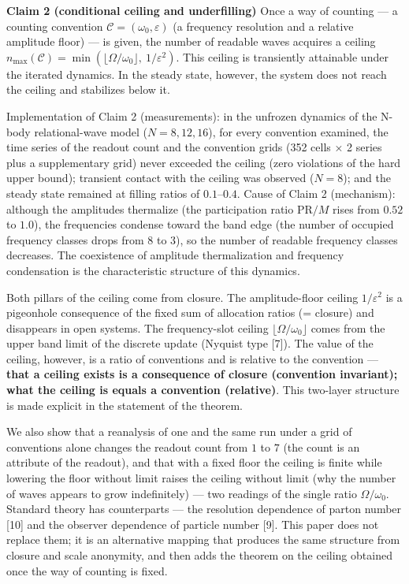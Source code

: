 \documentclass[
  a4paper,
]{article}
\begin{document}
\textbf{Claim 2 (conditional ceiling and underfilling)} Once a way of
counting --- a counting convention \(\mathcal C=(\omega_0,\varepsilon)\)
(a frequency resolution and a relative amplitude floor) --- is given,
the number of readable waves acquires a ceiling
\(n_{\max}(\mathcal C)=\min(\lfloor\Omega/\omega_0\rfloor,\ 1/\varepsilon^2)\).
This ceiling is transiently attainable under the iterated dynamics. In
the steady state, however, the system does not reach the ceiling and
stabilizes below it.

Implementation of Claim 2 (measurements): in the unfrozen dynamics of
the N-body relational-wave model (\(N=8,12,16\)), for every convention
examined, the time series of the readout count and the convention grids
(352 cells × 2 series plus a supplementary grid) never exceeded the
ceiling (zero violations of the hard upper bound); transient contact
with the ceiling was observed (\(N=8\)); and the steady state remained
at filling ratios of \(0.1\)--\(0.4\). Cause of Claim 2 (mechanism):
although the amplitudes thermalize (the participation ratio
\(\mathrm{PR}/M\) rises from \(0.52\) to \(1.0\)), the frequencies
condense toward the band edge (the number of occupied frequency classes
drops from \(8\) to \(3\)), so the number of readable frequency classes
decreases. The coexistence of amplitude thermalization and frequency
condensation is the characteristic structure of this dynamics.

Both pillars of the ceiling come from closure. The amplitude-floor
ceiling \(1/\varepsilon^2\) is a pigeonhole consequence of the fixed sum
of allocation ratios (= closure) and disappears in open systems. The
frequency-slot ceiling \(\lfloor\Omega/\omega_0\rfloor\) comes from the
upper band limit of the discrete update (Nyquist type {[}7{]}). The
value of the ceiling, however, is a ratio of conventions and is relative
to the convention --- \textbf{that a ceiling exists is a consequence of
closure (convention invariant); what the ceiling is equals a convention
(relative)}. This two-layer structure is made explicit in the statement
of the theorem.

We also show that a reanalysis of one and the same run under a grid of
conventions alone changes the readout count from \(1\) to \(7\) (the
count is an attribute of the readout), and that with a fixed floor the
ceiling is finite while lowering the floor without limit raises the
ceiling without limit (why the number of waves appears to grow
indefinitely) --- two readings of the single ratio \(\Omega/\omega_0\).
Standard theory has counterparts --- the resolution dependence of parton
number {[}10{]} and the observer dependence of particle number {[}9{]}.
This paper does not replace them; it is an alternative mapping that
produces the same structure from closure and scale anonymity, and then
adds the theorem on the ceiling obtained once the way of counting is
fixed.
\end{document}
